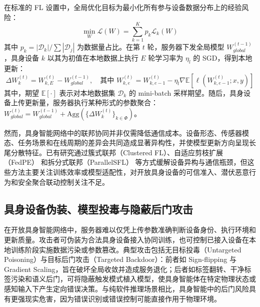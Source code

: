 \documentclass[11pt, a4paper, UTF8, fontset=fandol]{ctexart}
\begin{document}
在标准的 FL 设置中，全局优化目标为最小化所有参与设备数据分布上的经验风险：
\begin{equation}
    \min_{W} \mathcal{L}(W) = \sum_{k=1}^K p_k \mathcal{L}_k(W)
\end{equation}
其中 $p_k = |\mathcal{D}_k| / \sum |\mathcal{D}_j|$ 为数据量占比。在第 $t$ 轮，服务器下发全局模型 $W_{global}^{(t-1)}$，具身设备 $k$ 以其为初值在本地数据上执行 $E$ 轮学习率为 $\eta_l$ 的 SGD，得到本地更新：
\begin{equation}
    \Delta W_{k}^{(t)} = W_{k, E}^{(t)} - W_{global}^{(t-1)}, \quad \text{其中 } W_{k, e}^{(t)} = W_{k, e-1}^{(t)} - \eta_l \nabla \mathbb{E}[\ell(W_{k, e-1}^{(t)}; x, y)]
\end{equation}
其中，期望 $\mathbb{E}[\cdot]$ 表示对本地数据集 $\mathcal{D}_k$ 的 mini-batch 采样期望。随后，具身设备上传更新量，服务器执行某种形式的参数聚合：$W_{global}^{(t)} = W_{global}^{(t-1)} + \mathrm{Agg}(\{ \Delta W_{k}^{(t)} \}_{k\in\Phi})$。

然而，具身智能网络中的联邦协同并非仅需降低通信成本。设备形态、传感器模态、任务场景和在线周期的差异会共同造成显著异构性，并使模型更新方向呈现长尾分散特征。已有研究通过簇式联邦（Clustered FL）\cite{r9_clustered}、自适应剪枝扩展（FedPE）\cite{fedpe} 和拆分式联邦（ParallelSFL）\cite{parallelsfl} 等方式缓解设备异构与通信瓶颈，但这些方法主要关注训练效率或模型适配性，对开放具身设备的可信准入、潜伏恶意行为和安全聚合联动控制关注不足。

\subsection{具身设备伪装、模型投毒与隐蔽后门攻击}
在开放具身智能网络中，服务器难以仅凭上传参数准确判断设备身份、执行环境和更新质量。攻击者可伪装为合法具身设备接入协同训练，也可控制已接入设备在本地训练阶段实施数据污染或参数篡改。典型攻击包括无目标投毒（Untargeted Poisoning）与目标后门攻击（Targeted Backdoor）：前者如 Sign-flipping 与 Gradient Scaling，旨在破坏全局收敛并造成服务退化；后者如标签翻转、干净标签污染和语义后门，可将隐蔽触发模式植入模型，使具身智能体在特定物理状态或感知输入下产生定向错误决策。与纯软件推理场景相比，具身智能中的后门风险具有更强现实危害，因为错误识别或错误控制可能直接作用于物理环境。
\end{document}
